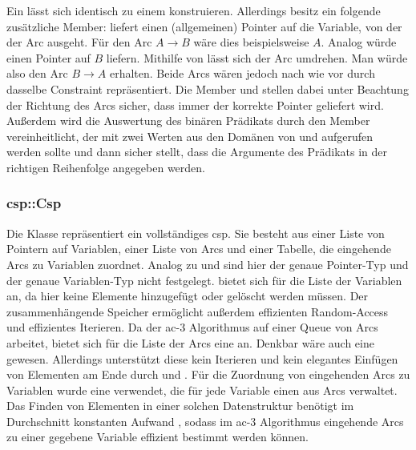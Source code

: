 Ein  lässt sich identisch zu einem  konstruieren. Allerdings besitz ein  folgende zusätzliche Member: 
liefert einen (allgemeinen) Pointer auf die Variable, von der der Arc ausgeht. Für den Arc $A \rightarrow B$ wäre dies beispielsweise $A$. Analog würde  einen
Pointer auf $B$ liefern. Mithilfe von  lässt sich der Arc umdrehen. Man würde also den Arc $B \rightarrow A$ erhalten. Beide Arcs wären jedoch nach wie vor
durch dasselbe Constraint repräsentiert. Die Member  und  stellen dabei unter Beachtung der Richtung des Arcs sicher, dass immer der korrekte
Pointer geliefert wird. Außerdem wird die Auswertung des binären Prädikats durch den Member  vereinheitlicht, der mit zwei Werten aus den Domänen
von  und  aufgerufen werden sollte und dann sicher stellt, dass die Argumente des Prädikats in der richtigen Reihenfolge angegeben werden.

\subsubsection{csp::Csp}
Die Klasse  repräsentiert ein vollständiges \ac*{csp}. Sie besteht aus einer Liste von Pointern auf Variablen, einer Liste von Arcs und einer Tabelle, die
eingehende Arcs zu Variablen zuordnet. Analog zu  und  sind hier der genaue Pointer-Typ und der genaue Variablen-Typ nicht festgelegt.
 bietet sich für die Liste der Variablen an, da hier keine Elemente hinzugefügt oder gelöscht werden müssen. Der zusammenhängende Speicher ermöglicht außerdem
effizienten Random-Access und effizientes Iterieren. Da der \ac*{ac}-3 Algorithmus auf einer Queue von Arcs arbeitet, bietet sich für die Liste der Arcs eine 
an. Denkbar wäre auch eine  gewesen. Allerdings unterstützt diese kein Iterieren und kein elegantes Einfügen von Elementen am Ende durch
 und . Für die Zuordnung von eingehenden Arcs zu Variablen wurde eine  verwendet, die für jede Variable
einen  aus Arcs verwaltet. Das Finden von Elementen in einer solchen Datenstruktur benötigt im Durchschnitt konstanten Aufwand \cite{uMap}, sodass im \ac*{ac}-3
Algorithmus eingehende Arcs zu einer gegebene Variable effizient bestimmt werden können.

